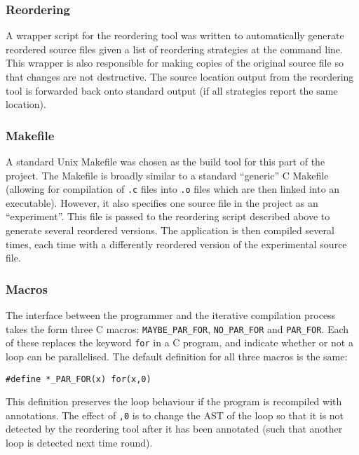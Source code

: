 \documentclass[journal]{IEEEtran}
\begin{document}
\subsubsection{Reordering}

A wrapper script for the reordering tool was written to automatically generate
reordered source files given a list of reordering strategies at the command
line. This wrapper is also responsible for making copies of the original source
file so that changes are not destructive. The source location output from the
reordering tool is forwarded back onto standard output (if all strategies report
the same location).

\subsubsection{Makefile}

A standard Unix Makefile was chosen as the build tool for this part of the
project. The Makefile is broadly similar to a standard ``generic'' C Makefile
(allowing for compilation of \texttt{.c} files into \texttt{.o} files which are
then linked into an executable). However, it also specifies one source file in
the project as an ``experiment''. This file is passed to the reordering script
described above to generate several reordered versions. The application is then
compiled several times, each time with a differently reordered version of the
experimental source file.

\subsubsection{Macros}

The interface between the programmer and the iterative compilation process takes
the form three C macros: \texttt{MAYBE\_PAR\_FOR}, \texttt{NO\_PAR\_FOR} and
\texttt{PAR\_FOR}. Each of these replaces the keyword \texttt{for} in a C
program, and indicate whether or not a loop can be parallelised. The default
definition for all three macros is the same: 

\begin{lstlisting}
#define *_PAR_FOR(x) for(x,0)
\end{lstlisting}

This definition preserves the loop behaviour if the program is recompiled with
annotations. The effect of \texttt{,0} is to change the AST of the loop so that
it is not detected by the reordering tool after it has been annotated (such that
another loop is detected next time round).
\end{document}

